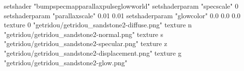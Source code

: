 setshader "bumpspecmapparallaxpulseglowworld"
setshaderparam "specscale" 0
setshaderparam "parallaxscale" 0.01 0.01
setshaderparam "glowcolor" 0.0 0.0 0.0
texture 0 "getridou/getridou_sandstone2-diffuse.png"
texture n "getridou/getridou_sandstone2-normal.png"
texture s "getridou/getridou_sandstone2-specular.png"
texture z "getridou/getridou_sandstone2-displacement.png"
texture g "getridou/getridou_sandstone2-glow.png"